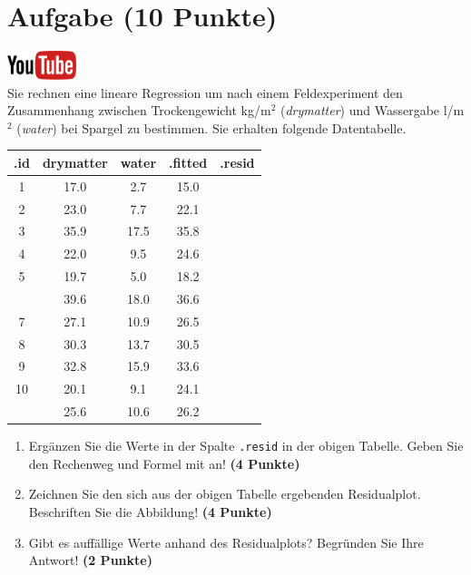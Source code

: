 \documentclass[a4paper, 9pt]{scrartcl}\usepackage[]{graphicx}\usepackage[]{xcolor}
\newenvironment{knitrout}{}{} %
\begin{document}
\section{Aufgabe \hfill (10 Punkte)}

\hfill\href{https://youtu.be/dyQlYV9nOqY}{\includegraphics[width =
  2cm]{img/youtube}}\\[1Ex]

Sie rechnen eine lineare Regression um nach einem Feldexperiment den
Zusammenhang zwischen Trockengewicht kg/m$^2$ (\textit{drymatter}) und
Wassergabe l/m$^2$ (\textit{water}) bei Spargel zu bestimmen. Sie erhalten
folgende Datentabelle.

\begin{knitrout}
\color{fgcolor}\begin{table}[!h]
\centering\begingroup\fontsize{12}{14}\selectfont

\begin{tabular}{ccccc}
\toprule
.id & drymatter & water & .fitted & .resid\\
\midrule
1 & 17.0 & 2.7 & 15.0 & \\
2 & 23.0 & 7.7 & 22.1 & \\
3 & 35.9 & 17.5 & 35.8 & \\
4 & 22.0 & 9.5 & 24.6 & \\
5 & 19.7 & 5.0 & 18.2 & \\
\addlinespace
6 & 39.6 & 18.0 & 36.6 & \\
7 & 27.1 & 10.9 & 26.5 & \\
8 & 30.3 & 13.7 & 30.5 & \\
9 & 32.8 & 15.9 & 33.6 & \\
10 & 20.1 & 9.1 & 24.1 & \\
\addlinespace
11 & 25.6 & 10.6 & 26.2 & \\
\bottomrule
\end{tabular}
\endgroup{}
\end{table}

\end{knitrout}

\begin{enumerate}
\item Erg{\"a}nzen Sie die Werte in der Spalte \texttt{.resid} in der obigen
  Tabelle. Geben Sie den Rechenweg und Formel mit an! \textbf{(4 Punkte)}
\item Zeichnen Sie den sich aus der obigen Tabelle ergebenden
  Residualplot. Beschriften Sie die Abbildung! \textbf{(4 Punkte)}
\item Gibt es auff{\"a}llige Werte anhand des Residualplots? Begr{\"u}nden Sie Ihre
  Antwort! \textbf{(2 Punkte)}
\end{enumerate}
 
\end{document}
